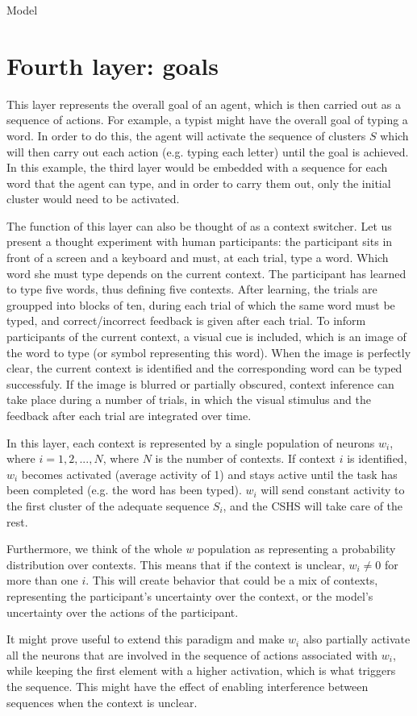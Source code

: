 \documentclass{report}
\begin{document}
\begin{chapter}{Model}
\section{Fourth layer: goals}
This layer represents the overall goal of an agent, which is then carried out as a sequence of actions. For example, a typist might have the overall goal of typing a word. In order to do this, the agent will activate the sequence of clusters $S$ which will then carry out each action (e.g. typing each letter) until the goal is achieved. In this example, the third layer would be embedded with a sequence for each word that the agent can type, and in order to carry them out, only the initial cluster would need to be activated.

The function of this layer can also be thought of as a context switcher. Let us present a thought experiment with human participants: the participant sits in front of a screen and a keyboard and must, at each trial, type a word. Which word she must type depends on the current context. The participant has learned to type five words, thus defining five contexts. After learning, the trials are groupped into blocks of ten, during each trial of which the same word must be typed, and correct/incorrect feedback is given after each trial. To inform participants of the current context, a visual cue is included, which is an image of the word to type (or symbol representing this word). When the image is perfectly clear, the current context is identified and the corresponding word can be typed successfuly. If the image is blurred or partially obscured, context inference can take place during a number of trials, in which the visual stimulus and the feedback after each trial are integrated over time.

In this layer, each context is represented by a single population of neurons $w_i$, where $i = 1, 2, ..., N$, where $N$ is the number of contexts. If context $i$ is identified, $w_i$ becomes activated (average activity of 1) and stays active until the task has been completed (e.g. the word has been typed). $w_i$ will send constant activity to the first cluster of the adequate sequence $S_i$, and the CSHS will take care of the rest. 

Furthermore, we think of the whole $w$ population as representing a probability distribution over contexts. This means that if the context is unclear, $w_i \ne 0$ for more than one $i$. This will create behavior that could be a mix of contexts, representing the participant's uncertainty over the context, or the model's uncertainty over the actions of the participant.

It might prove useful to extend this paradigm and make $w_i$ also partially activate all the neurons that are involved in the sequence of actions associated with $w_i$, while keeping the first element with a higher activation, which is what triggers the sequence. This might have the effect of enabling interference between sequences when the context is unclear.



\end{chapter}


\end{document}
